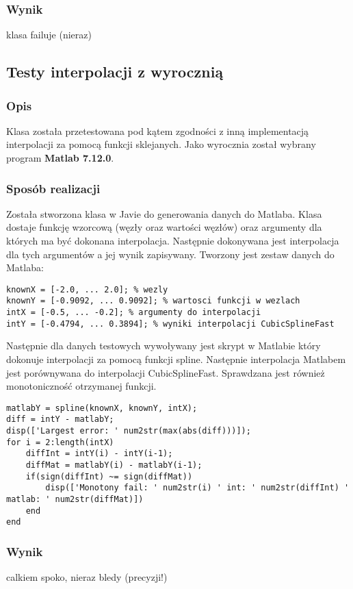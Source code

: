 \documentclass[a4paper,11pt,notitlepage]{article}
\begin{document}
\subsubsection{Wynik}

klasa failuje (nieraz)

\subsection{Testy interpolacji z wyrocznią}

\subsubsection{Opis}

Klasa została przetestowana pod kątem zgodności z inną implementacją interpolacji za pomocą funkcji sklejanych. Jako wyrocznia został wybrany program \textbf{Matlab 7.12.0}.

\subsubsection{Sposób realizacji}

Została stworzona klasa w Javie do generowania danych do Matlaba. Klasa dostaje funkcję wzorcową (węzły oraz wartości węzłów) oraz argumenty dla których ma być dokonana interpolacja. Następnie dokonywana jest interpolacja dla tych argumentów a jej wynik zapisywany. Tworzony jest zestaw danych do Matlaba:

\begin{lstlisting}
knownX = [-2.0, ... 2.0]; % wezly
knownY = [-0.9092, ... 0.9092]; % wartosci funkcji w wezlach
intX = [-0.5, ... -0.2]; % argumenty do interpolacji
intY = [-0.4794, ... 0.3894]; % wyniki interpolacji CubicSplineFast
\end{lstlisting}

Następnie dla danych testowych wywoływany jest skrypt w Matlabie który dokonuje interpolacji za pomocą funkcji spline. Następnie interpolacja Matlabem jest porównywana do interpolacji CubicSplineFast. Sprawdzana jest również monotoniczność otrzymanej funkcji.

\begin{lstlisting}
matlabY = spline(knownX, knownY, intX);
diff = intY - matlabY;
disp(['Largest error: ' num2str(max(abs(diff)))]);
for i = 2:length(intX)
    diffInt = intY(i) - intY(i-1);
    diffMat = matlabY(i) - matlabY(i-1);
    if(sign(diffInt) ~= sign(diffMat))
        disp(['Monotony fail: ' num2str(i) ' int: ' num2str(diffInt) ' matlab: ' num2str(diffMat)])
    end
end
\end{lstlisting}

\subsubsection{Wynik}

calkiem spoko, nieraz bledy (precyzji!)
\end{document}
